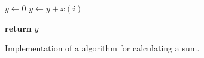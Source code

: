 



\graphicspath{{4/figures/}}



\begin{figure}[htb]
\begin{algorithmic}[1]


\State $y\gets0$
 
   \State $y\gets y+x(i)$ 
\EndFor

\State \textbf{return}  $y$ 
\EndProcedure
\end{algorithmic}
\caption[Implementation of a algorithm for calculating a sum.]{Implementation of a algorithm for calculating a sum.}
\label{fig:algorithm1}
\end{figure}





